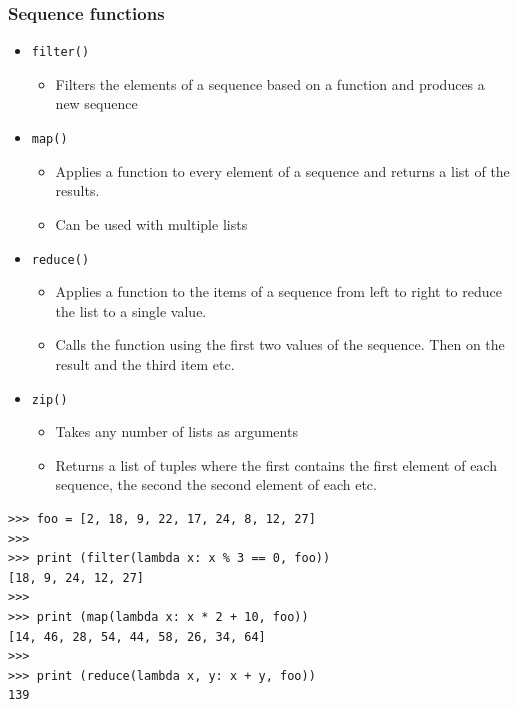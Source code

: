 \documentclass{beamer}
\begin{document}
\begin{frame}
\frametitle{Sequence functions}
\begin{itemize}
\item \texttt{filter()}
\begin{itemize}
\item Filters the elements of a sequence based on a function and produces a new sequence
\end{itemize}
\item \texttt{map()}
\begin{itemize}
\item Applies a function to every element of a sequence and returns a list of the results.
\item Can be used with multiple lists
\end{itemize}
\item \texttt{reduce()}
\begin{itemize}
\item Applies a function to the items of a sequence from left to right to reduce the list to a single value. 
\item Calls the function using the first two values of the sequence. Then on the result and the third item etc. 
\end{itemize}
\item \texttt{zip()}
\begin{itemize}
\item Takes any number of lists as arguments
\item Returns a list of tuples where the first contains the first element of each sequence, the second the second element of each etc.
\end{itemize}
\end{itemize}
\end{frame}

\begin{frame}[containsverbatim]
\begin{lstlisting}
>>> foo = [2, 18, 9, 22, 17, 24, 8, 12, 27]
>>> 
>>> print (filter(lambda x: x % 3 == 0, foo))
[18, 9, 24, 12, 27]
>>> 
>>> print (map(lambda x: x * 2 + 10, foo))
[14, 46, 28, 54, 44, 58, 26, 34, 64]
>>> 
>>> print (reduce(lambda x, y: x + y, foo))
139
\end{lstlisting}
\end{frame}
\end{document}
